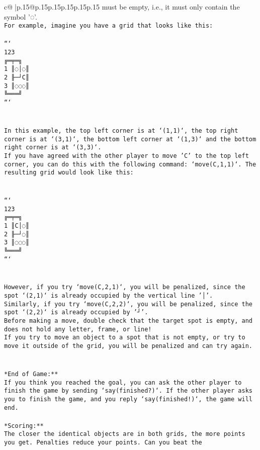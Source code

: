 \documentclass{article}
\begin{document}
{\begin{supertabular}{c@{$\;$}|p{.15\linewidth}@{}p{.15\linewidth}p{.15\linewidth}p{.15\linewidth}p{.15\linewidth}p{.15\linewidth}}
{{{must be empty, i.e., it must only contain the symbol '◌'.\\ \tt * For example, imagine you have a grid that looks like this: \\ \tt \\ \tt ```\\ \tt     123\\ \tt    ╔═╤═╗\\ \tt  1 ║◌│◌║\\ \tt  2 ╟─┘C║\\ \tt  3 ║◌◌◌║\\ \tt    ╚═══╝\\ \tt ```\\ \tt \\ \tt \\ \tt * In this example, the top left corner is at `(1,1)`, the top right corner is at `(3,1)`, the bottom left corner at `(1,3)` and the bottom right corner is at `(3,3)`.\\ \tt * If you have agreed with the other player to move 'C' to the top left corner, you can do this with the following command: `move(C,1,1)`. The resulting grid would look like this: \\ \tt \\ \tt \\ \tt ```\\ \tt     123\\ \tt    ╔═╤═╗\\ \tt  1 ║C│◌║\\ \tt  2 ╟─┘◌║\\ \tt  3 ║◌◌◌║\\ \tt    ╚═══╝\\ \tt ```\\ \tt \\ \tt \\ \tt * However, if you try `move(C,2,1)`, you will be penalized, since the spot `(2,1)` is already occupied by the vertical line '│'.\\ \tt * Similarly, if you try `move(C,2,2)`, you will be penalized, since the spot `(2,2)` is already occupied by '┘'.\\ \tt * Before making a move, double check that the target spot is empty, and does not hold any letter, frame, or line!\\ \tt * If you try to move an object to a spot that is not empty, or try to move it outside of the grid, you will be penalized and can try again.\\ \tt \\ \tt \\ \tt **End of Game:**\\ \tt If you think you reached the goal, you can ask the other player to finish the game by sending `say(finished?)`. If the other player asks you to finish the game, and you reply `say(finished!)`, the game will end.\\ \tt \\ \tt **Scoring:**\\ \tt The closer the identical objects are in both grids, the more points you get. Penalties reduce your points. Can you beat the }}}
\end{supertabular}}
\end{document}

